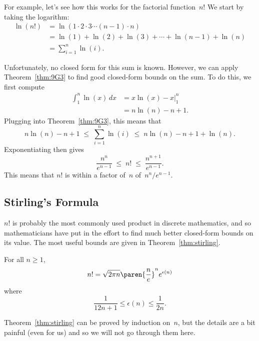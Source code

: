 For example, let's see how this works for the factorial
function~$n!$  We start by taking the logarithm:
\begin{align*}
\ln (n!)
       & =  \ln(1 \cdot 2 \cdot 3 \cdots (n-1) \cdot n) \\
       & =  \ln(1) + \ln(2) + \ln(3) + \cdots + \ln(n-1) + \ln(n) \\
       & =  \sum_{i=1}^n \ln(i).
\end{align*}

Unfortunately, no closed form for this sum is known.  However, we can
apply Theorem~\ref{thm:9G3} to find good closed-form bounds on the
sum.  To do this, we first compute
\begin{align*}
\int_1^n \ln(x) \, dx
    &= x \ln(x) - x \Bigr|_1^n \\
    &= n \ln(n) - n + 1.
\end{align*}
Plugging into Theorem~\ref{thm:9G3}, this means that
\begin{equation*}
    n \ln(n) - n + 1
    \;\le\; \sum_{i = 1}^n \ln(i)
    \;\le\; n \ln(n) - n + 1 + \ln(n).
\end{equation*}
Exponentiating then gives
\begin{equation}\label{eqn:9Q1}
    \frac{n^n}{e^{n - 1}} \;\le\; n! \;\le\; \frac{n^{n + 1}}{e^{n - 1}}.
\end{equation}
This means that $n!$ is within a factor of~$n$ of~$n^n/e^{n - 1}$.

\subsection{Stirling's Formula}

$n!$ is probably the most commonly used product in discrete
mathematics, and so mathematicians have put in the effort to find much
better closed-form bounds on its value.  The most useful bounds are
given in Theorem~\ref{thm:stirling}.

\begin{theorem}\label{thm:stirling}
For all $n \ge 1$,
\begin{equation*}
    n! = \sqrt{2 \pi n} \paren{\frac{n}{e}}^n e^{\epsilon(n)}
\end{equation*}
where
\begin{equation*}
    \frac{1}{12 n + 1} \le \epsilon(n) \le \frac{1}{2n}.
\end{equation*}
\end{theorem}

Theorem~\ref{thm:stirling} can be proved by induction on~$n$, but the
details are a bit painful (even for us) and so we will not go through
them here.

